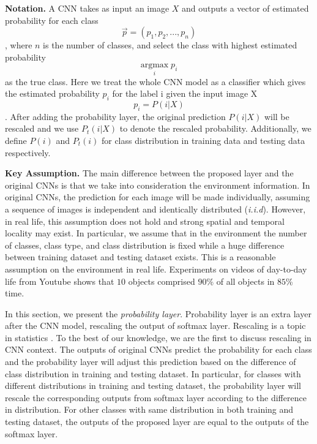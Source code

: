 \documentclass{article}
\begin{document}
\textbf{Notation.} A CNN takes as input an image $X$ and outputs a vector of estimated probability for each class \begin{equation}
    \vec{p} = (p_1, p_2, ..., p_n)
\end{equation}
, where $n$ is the number of classes, and select the class with highest estimated probability 
\begin{equation}
    \underset{i}{\text{argmax}} \; p_i
\end{equation}
as the true class. Here we treat the whole CNN model as a classifier which gives the estimated probability $p_i$ for the label i given the input image X
\begin{equation}
    p_i = P(i|X)
\end{equation}. After adding the probability layer, the original prediction $P(i|X)$ will be rescaled and we use $P_t(i|X)$ to denote the rescaled probability. Additionally, we define $P(i)$ and $P_t(i)$ for class distribution in training data and testing data respectively.


\textbf{Key Assumption. } 
The main difference between the proposed layer and the original CNNs is that we take into consideration the environment information. In original CNNs, the prediction for each image will be made individually, assuming a sequence of images is independent and identically distributed (\textit{i.i.d}). However, in real life, this assumption does not hold and strong spatial and temporal locality may exist. In particular, we assume that in the environment the number of classes, class type, and class distribution is fixed while a huge difference between training dataset and testing dataset exists. This is a reasonable assumption on the environment in real life. Experiments on videos of day-to-day life from Youtube \cite{shen2017fast} shows that $10$ objects comprised $90$\% of all objects in $85$\% time. 


In this section, we present the \textit{probability layer}. Probability layer is an extra layer after the CNN model, rescaling the output of softmax layer. Rescaling is a topic in statistics \cite{saerens2002adjusting}. To the best of our knowledge, we are the first to discuss rescaling in CNN context. The outputs of original CNNs predict the probability for each class and the probability layer will adjust this prediction based on the difference of class distribution in training and testing dataset. In particular, for classes with different distributions in training and testing dataset, the probability layer will rescale the corresponding outputs from softmax layer according to the difference in distribution. For other classes with same distribution in both training and testing dataset, the outputs of the proposed layer are equal to the outputs of the softmax layer. 
\end{document}
